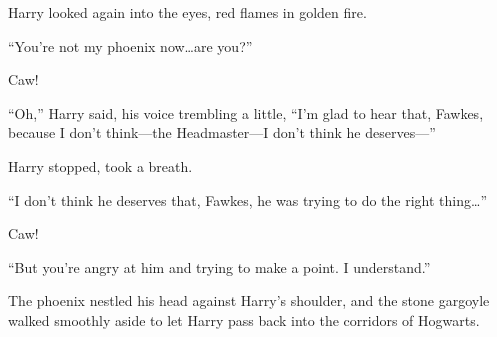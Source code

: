 Harry looked again into the eyes, red flames in golden fire.

“You’re not my phoenix now…are you?”

Caw!

“Oh,” Harry said, his voice trembling a little, “I’m glad to hear that, Fawkes, because I don’t think—the Headmaster—I don’t think he deserves—”

Harry stopped, took a breath.

“I don’t think he deserves that, Fawkes, he was trying to do the right thing…”

Caw!

“But you’re angry at him and trying to make a point. I understand.”

The phoenix nestled his head against Harry’s shoulder, and the stone gargoyle walked smoothly aside to let Harry pass back into the corridors of Hogwarts.

